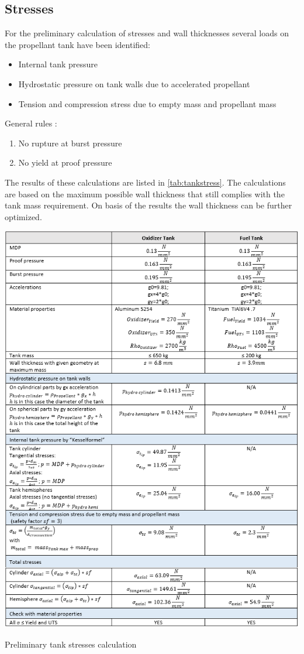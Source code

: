\subsection{Stresses}
For the preliminary calculation of stresses and wall thicknesses several loads on the propellant tank have been identified:
\begin{itemize}
    \item   Internal tank pressure
    \item	Hydrostatic pressure on tank walls due to accelerated propellant
    \item	Tension and compression stress due to empty mass and propellant mass
\end{itemize}{}
General rules : 
\begin{enumerate}
    \item No rupture at burst pressure
    \item No yield at proof pressure
\end{enumerate}{}

The results of these calculations are listed in \autoref{tab:tankstress}. The calculations are based on the maximum possible wall thickness that still complies with the tank mass requirement. On basis of the results the wall thickness can be further optimized.
\begin{table}[H]
    \centering
    \includegraphics[width = 0.95\linewidth]{tankstress}
    \caption{Preliminary tank stresses calculation}\label{tab:tankstress}
\end{table}{}
